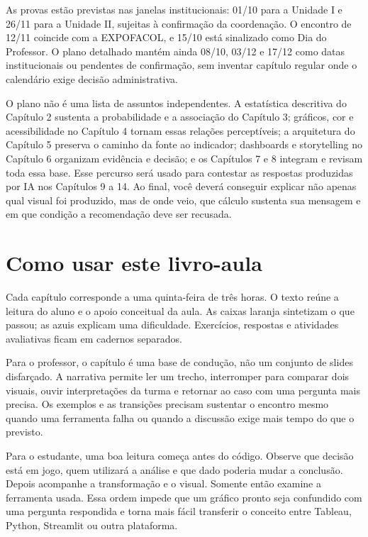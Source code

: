 As provas estão previstas nas janelas institucionais: 01/10 para a Unidade I e 26/11 para a Unidade II, sujeitas à confirmação da coordenação. O encontro de 12/11 coincide com a EXPOFACOL, e 15/10 está sinalizado como Dia do Professor. O plano detalhado mantém ainda 08/10, 03/12 e 17/12 como datas institucionais ou pendentes de confirmação, sem inventar capítulo regular onde o calendário exige decisão administrativa.

O plano não é uma lista de assuntos independentes. A estatística descritiva do Capítulo 2 sustenta a probabilidade e a associação do Capítulo 3; gráficos, cor e acessibilidade no Capítulo 4 tornam essas relações perceptíveis; a arquitetura do Capítulo 5 preserva o caminho da fonte ao indicador; dashboards e storytelling no Capítulo 6 organizam evidência e decisão; e os Capítulos 7 e 8 integram e revisam toda essa base. Esse percurso será usado para contestar as respostas produzidas por IA nos Capítulos 9 a 14. Ao final, você deverá conseguir explicar não apenas qual visual foi produzido, mas de onde veio, que cálculo sustenta sua mensagem e em que condição a recomendação deve ser recusada.

\section{Como usar este livro-aula}

Cada capítulo corresponde a uma quinta-feira de três horas. O texto reúne a leitura do aluno e o apoio conceitual da aula. As caixas laranja sintetizam o que passou; as azuis explicam uma dificuldade. Exercícios, respostas e atividades avaliativas ficam em cadernos separados.

Para o professor, o capítulo é uma base de condução, não um conjunto de slides disfarçado. A narrativa permite ler um trecho, interromper para comparar dois visuais, ouvir interpretações da turma e retornar ao caso com uma pergunta mais precisa. Os exemplos e as transições precisam sustentar o encontro mesmo quando uma ferramenta falha ou quando a discussão exige mais tempo do que o previsto.

Para o estudante, uma boa leitura começa antes do código. Observe que decisão está em jogo, quem utilizará a análise e que dado poderia mudar a conclusão. Depois acompanhe a transformação e o visual. Somente então examine a ferramenta usada. Essa ordem impede que um gráfico pronto seja confundido com uma pergunta respondida e torna mais fácil transferir o conceito entre Tableau, Python, Streamlit ou outra plataforma.

